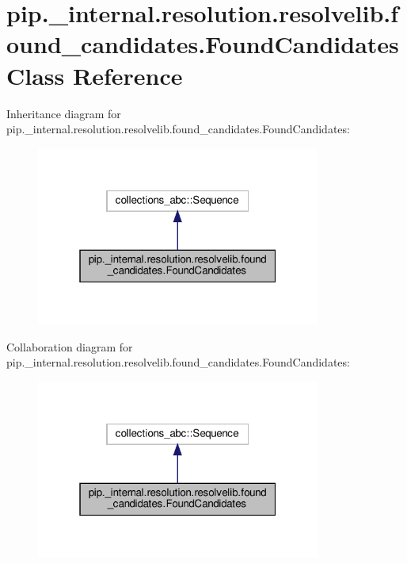 \hypertarget{classpip_1_1__internal_1_1resolution_1_1resolvelib_1_1found__candidates_1_1FoundCandidates}{}\section{pip.\+\_\+internal.\+resolution.\+resolvelib.\+found\+\_\+candidates.\+Found\+Candidates Class Reference}
\label{classpip_1_1__internal_1_1resolution_1_1resolvelib_1_1found__candidates_1_1FoundCandidates}


Inheritance diagram for pip.\+\_\+internal.\+resolution.\+resolvelib.\+found\+\_\+candidates.\+Found\+Candidates\+:
\nopagebreak
\begin{figure}[H]
\begin{center}
\leavevmode
\includegraphics[width=265pt]{classpip_1_1__internal_1_1resolution_1_1resolvelib_1_1found__candidates_1_1FoundCandidates__inherit__graph}
\end{center}
\end{figure}


Collaboration diagram for pip.\+\_\+internal.\+resolution.\+resolvelib.\+found\+\_\+candidates.\+Found\+Candidates\+:
\nopagebreak
\begin{figure}[H]
\begin{center}
\leavevmode
\includegraphics[width=265pt]{classpip_1_1__internal_1_1resolution_1_1resolvelib_1_1found__candidates_1_1FoundCandidates__coll__graph}
\end{center}
\end{figure}
